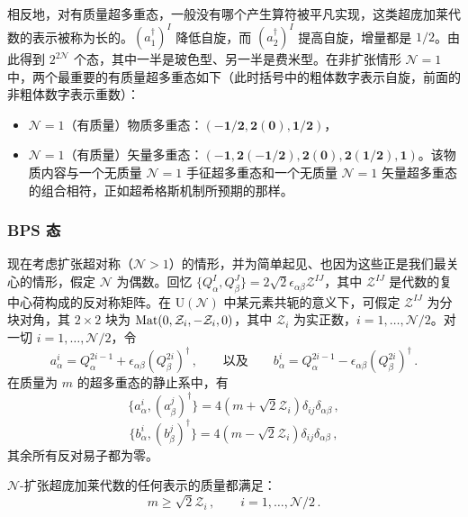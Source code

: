 相反地，对有质量超多重态，一般没有哪个产生算符被平凡实现，这类超庞加莱代数的表示被称为长的。$(a^\dagger_1)^I$ 降低自旋，而 $(a^\dagger_2)^I$ 提高自旋，增量都是 $1/2$。由此得到 $2^{2\mathcal{N}}$ 个态，其中一半是玻色型、另一半是费米型。在非扩张情形 $\mathcal{N}=1$ 中，两个最重要的有质量超多重态如下（此时括号中的粗体数字表示自旋，前面的非粗体数字表示重数）：

\begin{itemize}[leftmargin=2em]
\item $\mathcal{N}=1$（有质量）物质多重态：$(-\mathbf{1/2},\mathbf{2}(\mathbf{0}),\mathbf{1/2})$，
\item $\mathcal{N}=1$（有质量）矢量多重态：$(-\mathbf{1},\mathbf{2}(-\mathbf{1/2}),\mathbf{2}(\mathbf{0}),\mathbf{2}(\mathbf{1/2}),\mathbf{1})$。该物质内容与一个无质量 $\mathcal{N}=1$ 手征超多重态和一个无质量 $\mathcal{N}=1$ 矢量超多重态的组合相符，正如超希格斯机制所预期的那样。
\end{itemize}

\subsubsection*{BPS 态}

现在考虑扩张超对称（$\mathcal{N}>1$）的情形，并为简单起见、也因为这些正是我们最关心的情形，假定 $\mathcal{N}$ 为偶数。回忆 $\{Q^I_\alpha,Q^J_\beta\}=2\sqrt{2}\epsilon_{\alpha\beta}\mathcal{Z}^{IJ}$，其中 $\mathcal{Z}^{IJ}$ 是代数的复中心荷构成的反对称矩阵。在 $\mathrm{U}(\mathcal{N})$ 中某元素共轭的意义下，可假定 $\mathcal{Z}^{IJ}$ 为分块对角，其 $2\times 2$ 块为 $\operatorname{Mat}(0,\mathcal{Z}_i,-\mathcal{Z}_i,0)$，其中 $\mathcal{Z}_i$ 为实正数，$i=1,\dots,\mathcal{N}/2$。对一切 $i=1,\dots,\mathcal{N}/2$，令
\[
a^i_\alpha=Q^{2i-1}_\alpha+\epsilon_{\alpha\beta}(Q^{2i}_\beta)^\dagger\,,\qquad\text{以及}\qquad
b^i_\alpha=Q^{2i-1}_\alpha-\epsilon_{\alpha\beta}(Q^{2i}_\beta)^\dagger\,.
\]
在质量为 $m$ 的超多重态的静止系中，有
\[
\{a^i_\alpha,(a^j_\beta)^\dagger\}=4(m+\sqrt{2}\mathcal{Z}_i)\delta_{ij}\delta_{\alpha\beta}\,,
\]
\[
\{b^i_\alpha,(b^j_\beta)^\dagger\}=4(m-\sqrt{2}\mathcal{Z}_i)\delta_{ij}\delta_{\alpha\beta}\,,
\]
其余所有反对易子都为零。

\begin{proposition}[17.6] $\mathcal{N}$-扩张超庞加莱代数的任何表示的质量都满足：
\begin{equation}
m\ge\sqrt{2}\mathcal{Z}_i\,,\qquad i=1,\dots,\mathcal{N}/2\,.
\tag{17.3}
\end{equation}
\end{proposition}

